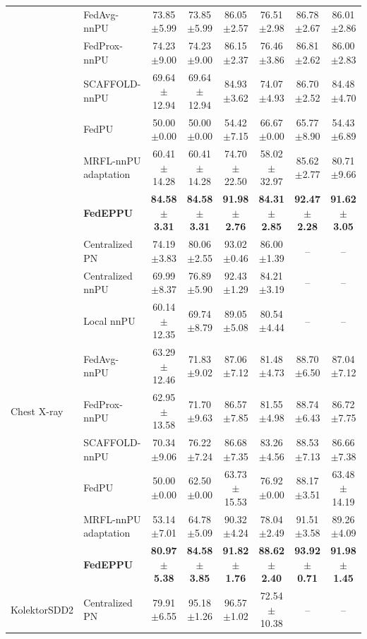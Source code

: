 \documentclass[lettersize,journal]{IEEEtran}
\begin{document}
\begin{table}[!t]
\begin{tabular}{llcccccc}
& FedAvg-nnPU & 73.85$\pm$5.99 & 73.85$\pm$5.99 & 86.05$\pm$2.57 & 76.51$\pm$2.98 & 86.78$\pm$2.67 & 86.01$\pm$2.86 \\
& FedProx-nnPU & 74.23$\pm$9.00 & 74.23$\pm$9.00 & 86.15$\pm$2.37 & 76.46$\pm$3.86 & 86.81$\pm$2.62 & 86.00$\pm$2.83 \\
& SCAFFOLD-nnPU & 69.64$\pm$12.94 & 69.64$\pm$12.94 & 84.93$\pm$3.62 & 74.07$\pm$4.93 & 86.70$\pm$2.52 & 84.48$\pm$4.70 \\
& FedPU & 50.00$\pm$0.00 & 50.00$\pm$0.00 & 54.42$\pm$7.15 & 66.67$\pm$0.00 & 65.77$\pm$8.90 & 54.43$\pm$6.89 \\
& MRFL-nnPU adaptation & 60.41$\pm$14.28 & 60.41$\pm$14.28 & 74.70$\pm$22.50 & 58.02$\pm$32.97 & 85.62$\pm$2.77 & 80.71$\pm$9.66 \\
& \textbf{FedEPPU} & \textbf{84.58$\pm$3.31} & \textbf{84.58$\pm$3.31} & \textbf{91.98$\pm$2.76} & \textbf{84.31$\pm$2.85} & \textbf{92.47$\pm$2.28} & \textbf{91.62$\pm$3.05} \\
\midrule
\multirow{9}{*}{Chest X-ray}
& Centralized PN & 74.19$\pm$3.83 & 80.06$\pm$2.55 & 93.02$\pm$0.46 & 86.00$\pm$1.39 & -- & -- \\
& Centralized nnPU & 69.99$\pm$8.37 & 76.89$\pm$5.90 & 92.43$\pm$1.29 & 84.21$\pm$3.19 & -- & -- \\
& Local nnPU & 60.14$\pm$12.35 & 69.74$\pm$8.79 & 89.05$\pm$5.08 & 80.54$\pm$4.44 & -- & -- \\
& FedAvg-nnPU & 63.29$\pm$12.46 & 71.83$\pm$9.02 & 87.06$\pm$7.12 & 81.48$\pm$4.73 & 88.70$\pm$6.50 & 87.04$\pm$7.12 \\
& FedProx-nnPU & 62.95$\pm$13.58 & 71.70$\pm$9.63 & 86.57$\pm$7.85 & 81.55$\pm$4.98 & 88.74$\pm$6.43 & 86.72$\pm$7.75 \\
& SCAFFOLD-nnPU & 70.34$\pm$9.06 & 76.22$\pm$7.24 & 86.68$\pm$7.35 & 83.26$\pm$4.56 & 88.53$\pm$7.13 & 86.66$\pm$7.38 \\
& FedPU & 50.00$\pm$0.00 & 62.50$\pm$0.00 & 63.73$\pm$15.53 & 76.92$\pm$0.00 & 88.17$\pm$3.51 & 63.48$\pm$14.19 \\
& MRFL-nnPU adaptation & 53.14$\pm$7.01 & 64.78$\pm$5.09 & 90.32$\pm$4.24 & 78.04$\pm$2.49 & 91.51$\pm$3.58 & 89.26$\pm$4.09 \\
& \textbf{FedEPPU} & \textbf{80.97$\pm$5.38} & \textbf{84.58$\pm$3.85} & \textbf{91.82$\pm$1.76} & \textbf{88.62$\pm$2.40} & \textbf{93.92$\pm$0.71} & \textbf{91.98$\pm$1.45} \\
\midrule
\multirow{9}{*}{KolektorSDD2}
& Centralized PN & 79.91$\pm$6.55 & 95.18$\pm$1.26 & 96.57$\pm$1.02 & 72.54$\pm$10.38 & -- & -- \\

\end{tabular}
\end{table}
\end{document}
